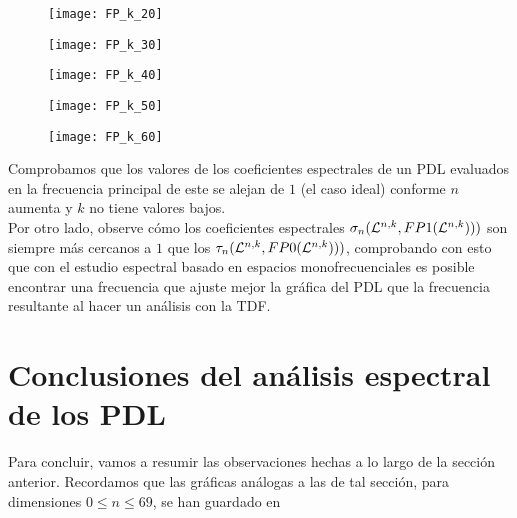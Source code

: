 \begin{figure}[H]
	\centering
	\texttt{[image: FP\_k\_20]} 
\end{figure}	

\begin{figure}[H]
	\centering
	\texttt{[image: FP\_k\_30]} 
\end{figure}	

\begin{figure}[H]
	\centering
	\texttt{[image: FP\_k\_40]} 
\end{figure}	

\begin{figure}[H]
	\centering
	\texttt{[image: FP\_k\_50]} 
\end{figure}	

\begin{figure}[H]
	\centering
	\texttt{[image: FP\_k\_60]} 
\end{figure}	


Comprobamos que los valores de los
coeficientes espectrales de un PDL
evaluados en la frecuencia principal de este 
se alejan de $1$ (el caso ideal)
conforme $n$ aumenta y $k$ no tiene valores bajos. \\

Por otro lado, 
observe cómo los coeficientes espectrales 
$\sigma_{n}(\mathcal{L}^{n,k}, FP1(\mathcal{L}^{n,k})))$ son 
siempre más cercanos a $1$
que los 
$\tau_{n}(\mathcal{L}^{n,k}, FP0(\mathcal{L}^{n,k})))$, 
comprobando con esto que con el estudio
espectral basado en espacios monofrecuenciales
es posible encontrar una frecuencia que ajuste mejor la
gráfica del PDL que la frecuencia resultante
al hacer un análisis con la TDF.

\section{Conclusiones del análisis espectral de los PDL}
Para concluir,
vamos a resumir las observaciones hechas a lo largo 
de la sección anterior.
Recordamos que las gráficas análogas a las de tal sección,
para dimensiones $0 \leq n \leq 69$, se han guardado 
en 


